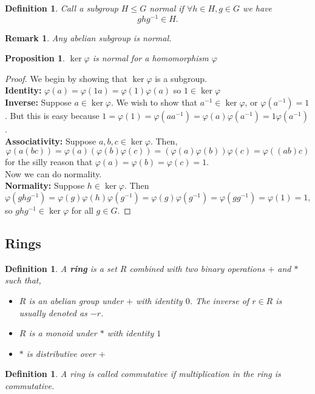 \documentclass{article}
\theoremstyle{norm}
\newtheorem{df}[thm]{Definition}
\newtheorem{rem}[thm]{Remark}
\newtheorem{prop}[thm]{Proposition}
\begin{document}
\begin{df}
Call a subgroup $H \leq G$ normal if $\forall h \in H, g \in G$ we have
\[ ghg^{-1} \in H. \]
\end{df}
\begin{rem}
Any abelian subgroup is normal.
\end{rem}
\begin{prop}
$\ker \varphi$ is normal for a homomorphism $\varphi$
\end{prop}
\begin{proof}
We begin by showing that $\ker \varphi$ is a subgroup. \\
\textbf{Identity:} $\varphi(a) = \varphi(1a) = \varphi(1) \varphi(a)$ so
$1 \in \ker \varphi$ \\
\textbf{Inverse:} Suppose $a \in \ker \varphi$. We wish to show that
$a^{-1} \in \ker \varphi$, or $\varphi(a^{-1}) = 1$. But this is easy
because $1 = \varphi(1) = \varphi(aa^{-1}) = \varphi(a) \varphi(a^{-1})
= 1 \varphi(a^{-1})$. \\
\textbf{Associativity:} Suppose $a, b, c \in \ker \varphi$. Then,
\[ \varphi(a(bc)) = \varphi(a)(\varphi(b)\varphi(c)) =
(\varphi(a)\varphi(b))\varphi(c) = \varphi((ab)c) \]
for the silly reason that $\varphi(a) = \varphi(b) = \varphi(c) = 1$. \\
Now we can do normality. \\
\textbf{Normality:} Suppose $h \in \ker \varphi$. Then
\[ \varphi(ghg^{-1}) = \varphi(g)\varphi(h)\varphi(g^{-1}) = \varphi(g)
\varphi(g^{-1}) = \varphi(g g^{-1}) = \varphi(1) = 1, \]
so $ghg^{-1} \in \ker \varphi$ for all $g \in G$.
\end{proof}

\subsection{Rings}
\begin{df}
A \textbf{ring} is a set $R$ combined with two binary operations $+$ and
$*$ such that,
\begin{itemize}
\item $R$ is an abelian group under $+$ with identity $0$. The inverse
of $r \in R$ is usually denoted as $-r$.
\item $R$ is a monoid under $*$ with identity $1$
\item $*$ is distributive over $+$
\end{itemize}
\end{df}

\begin{df}
A ring is called commutative if multiplication in the ring is
commutative.
\end{df}
\end{document}
